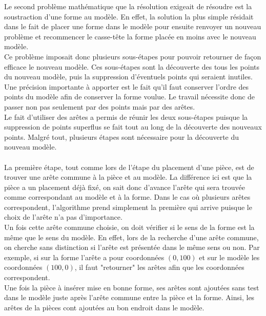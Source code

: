 \documentclass[a4paper, 11pt]{report}
\begin{document}
		Le second problème mathématique que la résolution exigeait de résoudre est la soustraction d'une forme au modèle. En effet, la solution la plus simple résidait dans le fait de placer une forme dans le modèle pour ensuite renvoyer un nouveau problème et recommencer le casse-t\^ete la forme placée en moins avec le nouveau modèle.\\
		Ce problème imposait donc plusieurs sous-étapes pour pouvoir retourner de façon efficace le nouveau modèle. Ces sous-étapes sont la découverte des tous les points du nouveau modèle, puis la suppression d'éventuels points qui seraient inutiles. Une précision importante à apporter est le fait qu'il faut conserver l'ordre des points du modèle afin de conserver la forme voulue. Le travail nécessite donc de passer non pas seulement par des points mais par des arêtes.\\
		Le fait d'utiliser des arêtes a permis de réunir les deux sous-étapes puisque la suppression de points superflus se fait tout au long de la découverte des nouveaux points. Malgré tout, plusieurs étapes sont nécessaire pour la découverte du nouveau modèle.\\ \ \\
		La première étape, tout comme lors de l'étape du placement d'une pièce, est de trouver une arête commune à la pièce et au modèle. La différence ici est que la pièce a un placement déjà fixé, on sait donc d'avance l'arête qui sera trouvée comme correspondant au modèle et à la forme. Dans le cas où plusieurs arêtes correspondent, l'algorithme prend simplement la première qui arrive puisque le choix de l'arête n'a pas d'importance.\\
		Un fois cette arête commune choisie, on doit vérifier si le sens de la forme est la même que le sens du modèle. En effet, lors de la recherche d'une arête commune, on cherche sans distinction si l'arête est présentée dans le même sens ou non. Par exemple, si sur la forme l'arête a pour coordonnées $(0,100)$ et sur le modèle les coordonnées $(100,0)$, il faut "retourner" les arêtes afin que les coordonnées correspondent.\\
		Une fois la pièce à insérer mise en bonne forme, ses arêtes sont ajoutées sans test dans le modèle juste après l'arête commune entre la pièce et la forme. Ainsi, les arêtes de la pièces cont ajoutées au bon endroit dans le modèle.\\
		
\end{document}
